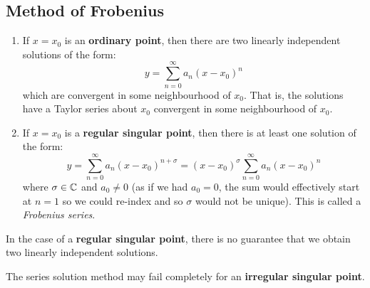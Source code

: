 \documentclass[../main.tex]{subfiles}
\begin{document}
\subsection{Method of Frobenius}
\begin{theorem}
  \begin{enumerate}\label{fuchTheorem}
    \item
      If $x = x_0$ is an \textbf{ordinary point}, then there are two linearly independent solutions of the form:
      \[
        y = \sum_{n = 0}^{\infty} a_n (x - x_0)^{n}
      \]
      which are convergent in some neighbourhood of $x_0$.
      That is, the solutions have a Taylor series about $x_0$ convergent in some neighbourhood of $x_0$.
    \item
      If $x = x_0$ is a \textbf{regular singular point}, then there is at least one solution of the form:
      \[
        y = \sum_{n=0}^{\infty} a_n(x - x_0)^{n + \sigma} = (x - x_0)^{\sigma} \sum_{n=0}^{\infty} a_n(x - x_0)^{n}
      \]
      where $\sigma \in \mathbb{C}$ and $a_0 \neq 0$ (as if we had $a_0 = 0$, the sum would effectively start at $n = 1$ so we could re-index and so $\sigma$ would not be unique).
      This is called a \textit{Frobenius series}.
  \end{enumerate}
\end{theorem}
\begin{remark}[Note]
  In the case of a \textbf{regular singular point}, there is no guarantee that we obtain two linearly independent solutions.

  The series solution method may fail completely for an \textbf{irregular singular point}.
\end{remark}
\end{document}
